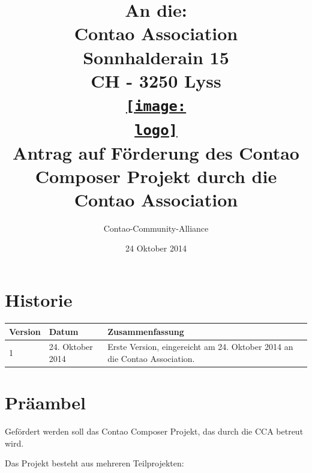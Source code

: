 \documentclass[
paper=a4,
draft=false,%
fontsize=10pt%
]{scrartcl}
\def\logo{logos/colorlogo_rgb}%
\begin{document}
\title{%
An die:\\
Contao Association\\
Sonnhalderain 15\\
CH - 3250 Lyss\\
\href{http://c-c-a.org}{\texttt{[image: \\logo]}}\\
Antrag auf Förderung des Contao Composer Projekt durch die Contao Association\\%
}
\date{24 Oktober 2014}
\author{Contao-Community-Alliance}
\maketitle

\pagebreak

%
%

\section*{Historie}
\label{sec:history}

\begin{tabular*}{\textwidth}{@{\extracolsep{\fill} }llp{}}
\textbf{Version} & \textbf{Datum} & \textbf{Zusammenfassung} \\
\hline
1 & 24. Oktober 2014 & Erste Version, eingereicht am 24. Oktober 2014 an die Contao Association.
\end{tabular*}

\pagebreak

%
%

\section*{Präambel}
\label{sec:preamble}

Gefördert werden soll das Contao Composer Projekt, das durch die CCA betreut wird.

Das Projekt besteht aus mehreren Teilprojekten:
\end{document}
